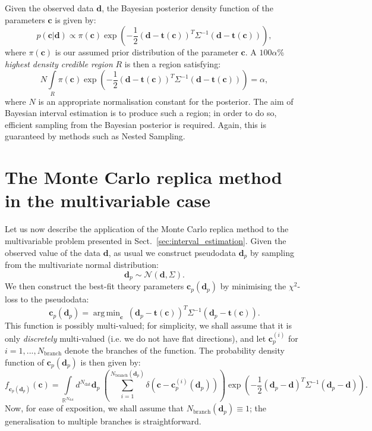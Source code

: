 \documentclass[withindex,glossary]{cam-thesis}
\renewcommand{\vec}[1]{\textbf{#1}} %
\DeclareMathOperator*{\argmin}{arg\,min}
\begin{document}
Given the observed data $\vec{d}$, the Bayesian posterior density function of the parameters $\vec{c}$ is given by:
\begin{equation}
p(\vec{c} | \vec{d}) \propto \pi(\vec{c}) \exp\left( -\frac{1}{2} (\vec{d} - \vec{t}(\vec{c}))^T \Sigma^{-1} (\vec{d} - \vec{t}(\vec{c})) \right),
\end{equation}
where $\pi(\vec{c})$ is our assumed prior distribution of the parameter $\vec{c}$. A $100\alpha$\% \textit{highest density credible region} $R$ is then a region satisfying:
\begin{equation}
\label{eq:multicredible}
N\int\limits_{R} \pi(\vec{c}) \exp\left( -\frac{1}{2} (\vec{d} - \vec{t}(\vec{c}))^T \Sigma^{-1} (\vec{d} - \vec{t}(\vec{c})) \right) = \alpha,
\end{equation}
where $N$ is an appropriate normalisation constant for the posterior. The aim of Bayesian interval estimation is to produce such a region; in order to do so, efficient sampling from the Bayesian posterior is required. Again, this is guaranteed by methods such as Nested Sampling.


\section{The Monte Carlo replica method in the multivariable case}
\label{sec:careful_mc}
Let us now describe the application of the Monte Carlo replica method to the multivariable problem presented in Sect.~\ref{sec:interval_estimation}. Given the observed value of the data $\vec{d}$, as usual we construct pseudodata $\vec{d}_p$ by sampling from the multivariate normal distribution:
\begin{equation}
\vec{d}_p \sim \mathcal{N}(\vec{d}, \Sigma).
\end{equation}
We then construct the best-fit theory parameters $\vec{c}_p(\vec{d}_p)$ by minimising the $\chi^2$-loss to the pseudodata:
\begin{equation}
\label{eq:cp_definition}
\vec{c}_p(\vec{d}_p) = \argmin_{\vec{c}}\ (\vec{d}_p - \vec{t}(\vec{c}))^T \Sigma^{-1} (\vec{d}_p - \vec{t}(\vec{c})) .
\end{equation}
This function is possibly multi-valued; for simplicity, we shall assume that it is only \textit{discretely} multi-valued (i.e. we do not have flat directions), and let $\vec{c}_p^{(i)}$ for $i=1,...,N_{\text{branch}}$ denote the branches of the function. The probability density function of $\vec{c}_p(\vec{d}_p)$ is then given by:
\begin{equation}
f_{\vec{c}_p(\vec{d}_p)}(\vec{c}) = \int\limits_{\mathbb{R}^{N_{\text{dat}}}} d^{N_{\text{dat}}}\vec{d}_p\ \left( \sum_{i=1}^{N_{\text{branch}}(\vec{d}_p)}\delta\left(\vec{c} - \vec{c}_p^{(i)}(\vec{d}_p) \right)\right) \exp\left( -\frac{1}{2} (\vec{d}_p - \vec{d})^T \Sigma^{-1} (\vec{d}_p - \vec{d}) \right).
\end{equation}
Now, for ease of exposition, we shall assume that $N_{\text{branch}}(\vec{d}_p) \equiv 1$; the generalisation to multiple branches is straightforward. 
\end{document}
